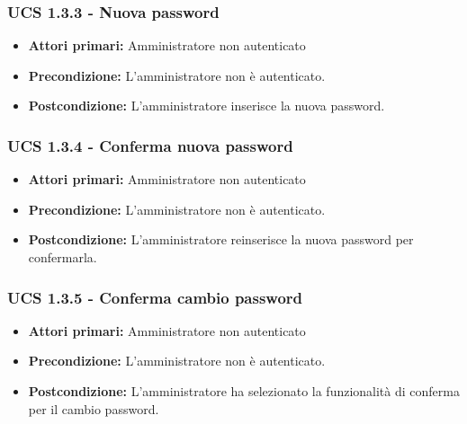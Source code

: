 \subsubsection{UCS 1.3.3 - Nuova password}
\begin{itemize}
\item \textbf{Attori primari:} Amministratore non autenticato
\item \textbf{Precondizione:}  L'amministratore non è autenticato.
\item \textbf{Postcondizione:} L'amministratore inserisce la nuova password.
\end{itemize}

\subsubsection{UCS 1.3.4 - Conferma nuova password}
\begin{itemize}
\item \textbf{Attori primari:} Amministratore non autenticato
\item \textbf{Precondizione:} L'amministratore non è autenticato.
\item \textbf{Postcondizione:} L'amministratore reinserisce la nuova password per confermarla.
\end{itemize}

\subsubsection{UCS 1.3.5 - Conferma cambio password}%
\begin{itemize}
\item \textbf{Attori primari:} Amministratore non autenticato
\item \textbf{Precondizione:} L'amministratore non è autenticato.
\item \textbf{Postcondizione:} L'amministratore ha selezionato la funzionalità di conferma per il cambio password.
\end{itemize}
